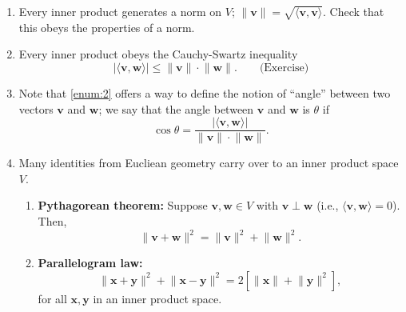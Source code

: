 \documentclass[letterpaper, reqno,11pt]{article}
\begin{document}
\begin{enumerate}
\item Every inner product generates a norm on $V$; $\lVert \mathbf v \rVert = \sqrt{\langle \mathbf v, \mathbf v \rangle}$. Check that this obeys the properties of a norm.
\item \label{enum:2} Every inner product obeys the Cauchy-Swartz inequality
  \[ |\langle \mathbf v, \mathbf w \rangle| \leq \lVert \mathbf v \rVert \cdot \lVert \mathbf w \rVert. \qquad \text{(Exercise)} \]
\item Note that \ref{enum:2} offers a way to define the notion of ``angle'' between two vectors $\mathbf v$ and $\mathbf w$; we say that the angle between $\mathbf v$ and $\mathbf w$ is $\theta$ if
  \[ \cos\theta = \frac{|\langle \mathbf v, \mathbf w \rangle|}{\lVert \mathbf v \rVert \cdot \lVert \mathbf w \rVert}. \]

  \begin{figure}[H]
    \centering
  \end{figure}
\item Many identities from Eucliean geometry carry over to an inner product space $V$.
  \begin{enumerate}
  \item {\bf Pythagorean theorem:} Suppose $\mathbf v, \mathbf w \in V$ with $\mathbf v \perp \mathbf w$ (i.e., $\langle \mathbf v, \mathbf w \rangle = 0$). Then,
    \[ \lVert \mathbf v + \mathbf w \rVert^2 = \lVert \mathbf v \rVert^2 + \lVert \mathbf w \rVert^2. \]
    
    \begin{figure}[H]
      \centering
    \end{figure}
  \item {\bf Parallelogram law:}
    \[ \lVert \mathbf x + \mathbf y \rVert^2 + \lVert \mathbf x - \mathbf y \rVert^2 = 2 \left[ \lVert \mathbf x \rVert + \lVert \mathbf y \rVert^2 \right], \]
    for all $\mathbf x, \mathbf y$ in an inner product space.


\end{enumerate}
\end{enumerate}
\end{document}

